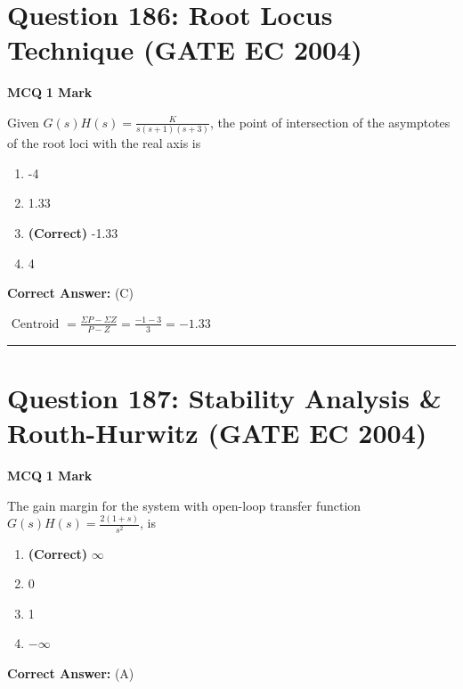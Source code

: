 \documentclass[11pt,a4paper]{article}
\begin{document}
\section*{Question 186: Root Locus Technique (GATE EC 2004)}
\noindent \textbf{\color{primary}MCQ} \hfill \textbf{\color{secondary}1 Mark}


\noindent Given $G(s)H(s)=\frac{K}{s(s+1)(s+3)}$,  the point of intersection of the asymptotes of
the root loci with the real axis is


\begin{enumerate}[label=(\Alph*)]
    \item -4
    \item 1.33
    \item \textbf{(Correct)} -1.33
    \item 4
\end{enumerate}

\noindent \textbf{Correct Answer:} (C)

\begin{tcolorbox}[solbox, title=Detailed Solution -- Question 186]
$\text { Centroid }=\frac{\Sigma P-\Sigma Z}{P-Z}=\frac{-1-3}{3}=-1.33$
\end{tcolorbox}

\vspace{1.5em}
\hrule
\vspace{1.5em}

\section*{Question 187: Stability Analysis \& Routh-Hurwitz (GATE EC 2004)}
\noindent \textbf{\color{primary}MCQ} \hfill \textbf{\color{secondary}1 Mark}


\noindent The gain margin for the system with open-loop transfer function $G(s)H(s)=\frac{2(1+s)}{s^{2}}$, is


\begin{enumerate}[label=(\Alph*)]
    \item \textbf{(Correct)} $\infty$
    \item 0
    \item 1
    \item $-\infty$
\end{enumerate}

\noindent \textbf{Correct Answer:} (A)
\end{document}
